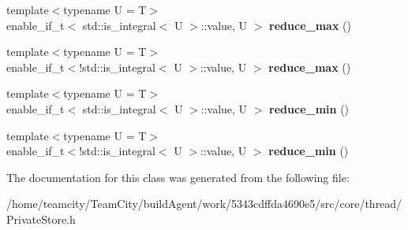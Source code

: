 \begin{DoxyCompactItemize}
\item 
{\footnotesize template$<$typename U  = T$>$ }\\enable\+\_\+if\+\_\+t$<$ std\+::is\+\_\+integral$<$ U $>$\+::value, U $>$ {\bfseries reduce\+\_\+max} ()\hypertarget{classPrivateStore_a9570f2fe702af3382e224107140b9dce}{}\label{classPrivateStore_a9570f2fe702af3382e224107140b9dce}

\item 
{\footnotesize template$<$typename U  = T$>$ }\\enable\+\_\+if\+\_\+t$<$!std\+::is\+\_\+integral$<$ U $>$\+::value, U $>$ {\bfseries reduce\+\_\+max} ()\hypertarget{classPrivateStore_a3611241ee09ef386660c12f034199200}{}\label{classPrivateStore_a3611241ee09ef386660c12f034199200}

\item 
{\footnotesize template$<$typename U  = T$>$ }\\enable\+\_\+if\+\_\+t$<$ std\+::is\+\_\+integral$<$ U $>$\+::value, U $>$ {\bfseries reduce\+\_\+min} ()\hypertarget{classPrivateStore_a3606e73cdb7b44da0d619fca8428eab5}{}\label{classPrivateStore_a3606e73cdb7b44da0d619fca8428eab5}

\item 
{\footnotesize template$<$typename U  = T$>$ }\\enable\+\_\+if\+\_\+t$<$!std\+::is\+\_\+integral$<$ U $>$\+::value, U $>$ {\bfseries reduce\+\_\+min} ()\hypertarget{classPrivateStore_a073b202ca5d061fc82adce77964ba488}{}\label{classPrivateStore_a073b202ca5d061fc82adce77964ba488}

\end{DoxyCompactItemize}


The documentation for this class was generated from the following file\+:\begin{DoxyCompactItemize}
\item 
/home/teamcity/\+Team\+City/build\+Agent/work/5343cdffda4690e5/src/core/thread/Private\+Store.\+h\end{DoxyCompactItemize}
